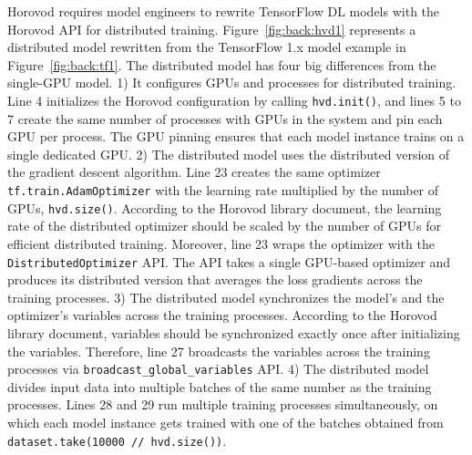Horovod requires model engineers to rewrite TensorFlow DL models with the
Horovod API for distributed training.
Figure~\ref{fig:back:hvd1} represents a distributed model rewritten from the
TensorFlow 1.x model example in Figure~\ref{fig:back:tf1}.
The distributed model has four big differences from the single-GPU model.
1) It configures GPUs and processes for distributed training.
Line 4 initializes the Horovod configuration by calling {\tt hvd.init()},
and lines 5 to 7 create the same number of processes with GPUs in the
system and pin each GPU per process. 
The GPU pinning ensures that each model instance trains on a single
dedicated GPU.
2) The distributed model uses the distributed version of the gradient
descent algorithm. 
Line 23 creates the same optimizer {\tt tf.train.AdamOptimizer} with the
learning rate multiplied by the number of GPUs, {\tt hvd.size()}. 
According to the Horovod library document, the learning rate of the distributed
optimizer should be scaled by the number of GPUs for efficient distributed
training. 
Moreover, line 23 wraps the optimizer with the {\tt DistributedOptimizer}
API. 
The API takes a single GPU-based optimizer and produces its distributed version
that averages the loss gradients across the training processes.
3) The distributed model synchronizes the model's and the optimizer's variables
across the training processes.
According to the Horovod library document, variables should be synchronized
exactly once after initializing the variables.
Therefore, line 27 broadcasts the variables across the training processes
via {\tt broadcast\_global\_variables} API.
4) The distributed model divides input data into multiple batches of the same
number as the training processes. 
Lines 28 and 29 run multiple training processes simultaneously, on which
each model instance gets trained with one of the batches obtained from {\tt
dataset.take(10000 // hvd.size())}. 



